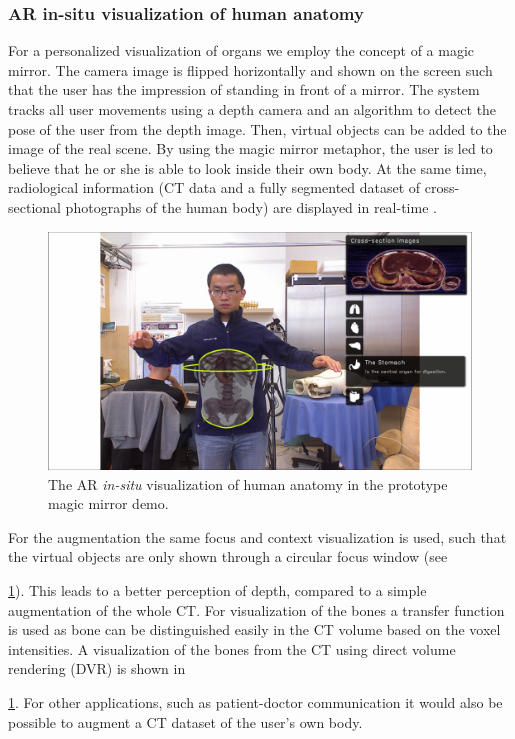 {{\subsubsection{AR in-situ visualization of human anatomy}
For a personalized visualization of organs we employ the concept of a magic mirror. The camera image is flipped horizontally and shown on the screen such that the user has the impression of standing in front of a mirror. The system tracks all user movements using a depth camera and an algorithm to detect the pose of the user from the depth image. Then, virtual objects can be added to the image of the real scene. By using the magic mirror metaphor, the user is led to believe that he or she is able to look inside their own body. At the same time, radiological information (CT data and a fully segmented dataset of cross-sectional photographs of the human body) are displayed in real-time \cite{Blum2012}.
\begin{figure}
\centering
\includegraphics[width=0.7\linewidth]{figures/3-MMC/Mirracle}
\caption[Magic Mirror Demo]{The AR \textit{in-situ} visualization of human anatomy in the prototype magic mirror demo.}
\label{fig:3-MMC:Mirracle}
\end{figure}
For the augmentation the same focus and context visualization \cite{Bichlmeier2007} is used, such that the virtual objects are only shown through a circular focus window (see \figurename{\ref{fig:3-MMC:Mirracle}). This leads to a better perception of depth, compared to a simple augmentation of the whole CT. 
For visualization of the bones a transfer function is used as bone can be distinguished easily in the CT volume based on the voxel intensities. A visualization of the bones from the CT using direct volume rendering (DVR) is shown in \figurename{\ref{fig:3-MMC:Mirracle}. For other applications, such as patient-doctor communication it would also be possible to augment a CT dataset of the user's own body.

}}}}
